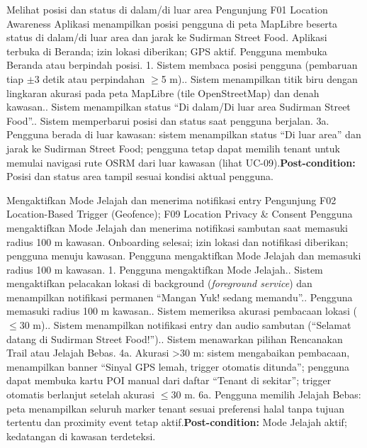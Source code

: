 {Melihat posisi dan status di dalam/di luar area}
{Pengunjung}
{F01 Location Awareness}
{Aplikasi menampilkan posisi pengguna di peta MapLibre beserta status di dalam/di luar area dan jarak ke Sudirman Street Food.}
{Aplikasi terbuka di Beranda; izin lokasi diberikan; GPS aktif.}
{Pengguna membuka Beranda atau berpindah posisi.}
{1. Sistem membaca posisi pengguna (pembaruan tiap \(\pm\)3 detik atau perpindahan \(\ge\)5 m).. Sistem menampilkan titik biru dengan lingkaran akurasi pada peta MapLibre (tile OpenStreetMap) dan denah kawasan.. Sistem menampilkan status ``Di dalam/Di luar area Sudirman Street Food''.. Sistem memperbarui posisi dan status saat pengguna berjalan.}
{3a. Pengguna berada di luar kawasan: sistem menampilkan status ``Di luar area'' dan jarak ke Sudirman Street Food; pengguna tetap dapat memilih tenant untuk memulai navigasi rute OSRM dari luar kawasan (lihat UC-09).\newline\textbf{Post-condition:} Posisi dan status area tampil sesuai kondisi aktual pengguna.}

{Mengaktifkan Mode Jelajah dan menerima notifikasi entry}
{Pengunjung}
{F02 Location-Based Trigger (Geofence); F09 Location Privacy \& Consent}
{Pengguna mengaktifkan Mode Jelajah dan menerima notifikasi sambutan saat memasuki radius 100 m kawasan.}
{Onboarding selesai; izin lokasi dan notifikasi diberikan; pengguna menuju kawasan.}
{Pengguna mengaktifkan Mode Jelajah dan memasuki radius 100 m kawasan.}
{1. Pengguna mengaktifkan Mode Jelajah.. Sistem mengaktifkan pelacakan lokasi di background (\textit{foreground service}) dan menampilkan notifikasi permanen ``Mangan Yuk! sedang memandu''.. Pengguna memasuki radius 100 m kawasan.. Sistem memeriksa akurasi pembacaan lokasi (\(\le\)30 m).. Sistem menampilkan notifikasi entry dan audio sambutan (``Selamat datang di Sudirman Street Food!'').. Sistem menawarkan pilihan Rencanakan Trail atau Jelajah Bebas.}
{4a. Akurasi >30 m: sistem mengabaikan pembacaan, menampilkan banner ``Sinyal GPS lemah, trigger otomatis ditunda''; pengguna dapat membuka kartu POI manual dari daftar ``Tenant di sekitar''; trigger otomatis berlanjut setelah akurasi \(\le\)30 m.\newline
6a. Pengguna memilih Jelajah Bebas: peta menampilkan seluruh marker tenant sesuai preferensi halal tanpa tujuan tertentu dan proximity event tetap aktif.\newline\textbf{Post-condition:} Mode Jelajah aktif; kedatangan di kawasan terdeteksi.}

